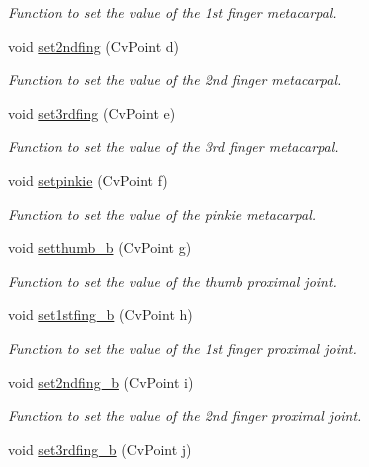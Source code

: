 \begin{DoxyCompactItemize}
\begin{DoxyCompactList}\small\item\em Function to set the value of the 1st finger metacarpal. \end{DoxyCompactList}\item 
void \hyperlink{classFullhand_a14a97b544809b004493914c36b8fe49a}{set2ndfing} (CvPoint d)
\begin{DoxyCompactList}\small\item\em Function to set the value of the 2nd finger metacarpal. \end{DoxyCompactList}\item 
void \hyperlink{classFullhand_ac0804f3450b70dc576cddcc519246755}{set3rdfing} (CvPoint e)
\begin{DoxyCompactList}\small\item\em Function to set the value of the 3rd finger metacarpal. \end{DoxyCompactList}\item 
void \hyperlink{classFullhand_acf218c9bc86d5e29b61b2885d86cd1c3}{setpinkie} (CvPoint f)
\begin{DoxyCompactList}\small\item\em Function to set the value of the pinkie metacarpal. \end{DoxyCompactList}\item 
void \hyperlink{classFullhand_a119df621ef1c610c7e39748d90e88fbe}{setthumb\_\-b} (CvPoint g)
\begin{DoxyCompactList}\small\item\em Function to set the value of the thumb proximal joint. \end{DoxyCompactList}\item 
void \hyperlink{classFullhand_ada79a4f4bc30b938fe4bf4133dda4898}{set1stfing\_\-b} (CvPoint h)
\begin{DoxyCompactList}\small\item\em Function to set the value of the 1st finger proximal joint. \end{DoxyCompactList}\item 
void \hyperlink{classFullhand_af9f0979ae5a18fb8c120df33c1b5ce81}{set2ndfing\_\-b} (CvPoint i)
\begin{DoxyCompactList}\small\item\em Function to set the value of the 2nd finger proximal joint. \end{DoxyCompactList}\item 
void \hyperlink{classFullhand_af397802eb0b3046110c2f79df9605f81}{set3rdfing\_\-b} (CvPoint j)

\end{DoxyCompactItemize}
